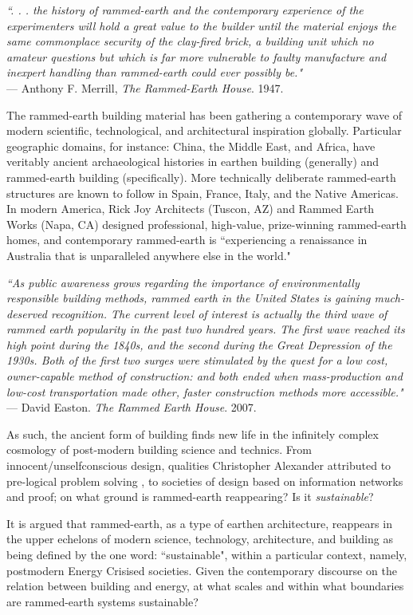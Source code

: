 \begin{flushright}
  \small{
  \textit{``. . . the history of rammed-earth and the contemporary
experience of the experimenters will hold a great value to
the builder until the material enjoys the same commonplace
security of the clay-fired brick, a building unit which no
amateur questions but which is far more vulnerable to
faulty manufacture and inexpert handling than rammed-earth
could ever possibly be."} \\
--- Anthony F. Merrill, \textit{The Rammed-Earth House}. 1947.}
\end{flushright}

The rammed-earth building material has been gathering a contemporary wave of modern scientific, technological, and architectural inspiration globally. Particular geographic domains, for instance: China, the Middle East, and Africa, have veritably ancient archaeological histories in earthen building (generally) and rammed-earth building (specifically). More technically deliberate rammed-earth structures are known to follow in Spain, France, Italy, and the Native Americas. In modern America, Rick Joy Architects (Tuscon, AZ) and Rammed Earth Works (Napa, CA) designed professional, high-value, prize-winning rammed-earth homes, and contemporary rammed-earth is ``experiencing a renaissance in Australia that is unparalleled anywhere else in the world." \cite{RAMMEDEARTHHOUSE}

\begin{flushright}
  \small{
  \textit{
``As public awareness grows regarding the importance of environmentally responsible building methods, rammed earth in the United States is gaining much-deserved recognition. The current level of interest is actually the third wave of rammed earth popularity in the past two hundred years. The first wave reached its high point during the 1840s, and the second during the Great Depression of the 1930s. Both of the first two surges were stimulated by the quest for a low cost, owner-capable method of construction: and both ended when mass-production and low-cost transportation made other, faster construction methods more accessible." } \\
 --- David Easton. \textit{The Rammed Earth House}. 2007.}
\end{flushright}

As such, the ancient form of building finds new life in the infinitely complex cosmology of post-modern building science and technics. From innocent/unselfconscious design, qualities Christopher Alexander attributed to pre-logical problem solving \cite[p8]{SYNOFFORM}, to societies of design based on information networks and proof; on what ground is rammed-earth reappearing? Is it \textit{sustainable}?

It is argued that rammed-earth, as a type of earthen architecture, reappears in the upper echelons of modern science, technology, architecture, and building as being defined by the one word: ``sustainable", within a particular context, namely, postmodern Energy Crisised societies. Given the contemporary discourse on the relation between building and energy, at what scales and within what boundaries are rammed-earth systems sustainable?
